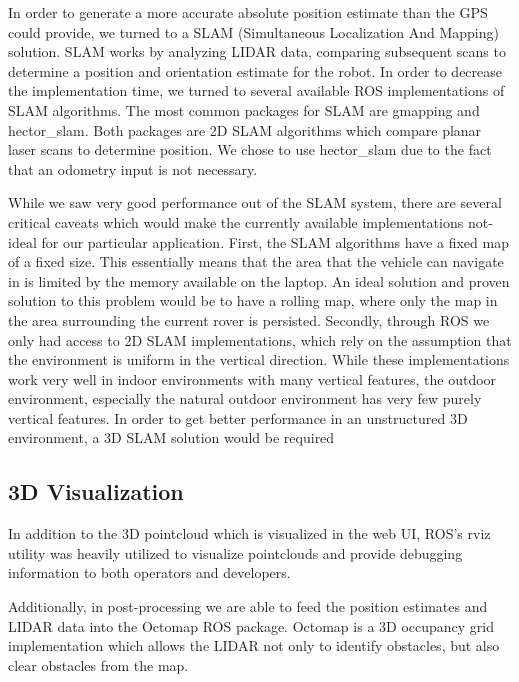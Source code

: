 
In order to generate a more accurate absolute position estimate than the GPS could provide, we turned to a SLAM (Simultaneous Localization And Mapping) solution. SLAM works by analyzing LIDAR data, comparing subsequent scans to determine a position and orientation estimate for the robot. In order to decrease the implementation time, we turned to several available ROS implementations of SLAM algorithms. The most common packages for SLAM are gmapping and hector\_slam. Both packages are 2D SLAM algorithms which compare planar laser scans to determine position. We chose to use hector\_slam due to the fact that an odometry input is not necessary.  

While we saw very good performance out of the SLAM system, there are several critical caveats which would make the currently available implementations not-ideal for our particular application. First, the SLAM algorithms have a fixed map of a fixed size. This essentially means that the area that the vehicle can navigate in is limited by the memory available on the laptop. An ideal solution and proven solution to this problem would be to have a rolling map, where only the map in the area surrounding the current rover is persisted. Secondly, through ROS we only had access to 2D SLAM implementations, which rely on the assumption that the environment is uniform in the vertical direction. While these implementations work very well in indoor environments with many vertical features, the outdoor environment, especially the natural outdoor environment has very few purely vertical features. In order to get better performance in an unstructured 3D environment, a 3D SLAM solution would be required

\subsection{3D Visualization}


In addition to the 3D pointcloud which is visualized in the web UI, ROS's rviz utility was heavily utilized to visualize pointclouds and provide debugging information to both operators and developers. 


Additionally, in post-processing we are able to feed the position estimates and LIDAR data into the Octomap ROS package. Octomap is a 3D occupancy grid implementation which allows the LIDAR not only to identify obstacles, but also clear obstacles from the map.

